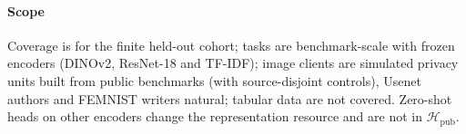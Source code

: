 \paragraph{Scope}
Coverage is for the finite held-out cohort; tasks are benchmark-scale with
frozen encoders (DINOv2, ResNet-18 and TF-IDF); image clients are simulated
privacy units built from public benchmarks (with source-disjoint controls),
Usenet authors and FEMNIST writers natural; tabular data are not covered.
Zero-shot heads on other encoders change the representation resource and are
not in $\mathcal H_{\mathrm{pub}}$.
